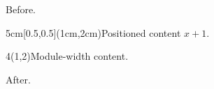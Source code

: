 \documentclass{article}
\begin{document}
Before.
\begin{textblock*}{5cm}[0.5,0.5](1cm,2cm)Positioned content $x+1$.\end{textblock*}
\begin{textblock}{4}(1,2)Module-width content.\end{textblock}
After.
\end{document}
